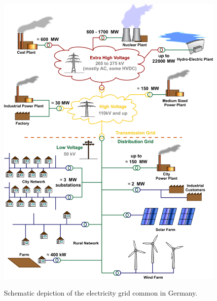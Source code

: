 \begin{figure}[h]
	\begin{centering}
		{\includegraphics[scale=0.27]{figures/background/grid_schematic.pdf}}
		\caption{Schematic depiction of the electricity grid common in Germany.}
		\label{fig:tri}
	\end{centering}
\end{figure}
